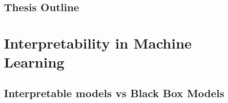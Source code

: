 \documentclass[english]{tktltiki2}
\theoremstyle{definition}
\theoremstyle{remark}
\begin{document}
\subsection{Thesis Outline} %

\section{Interpretability in Machine Learning} %

\subsection{Interpretable models vs Black Box Models} %
\end{document}
